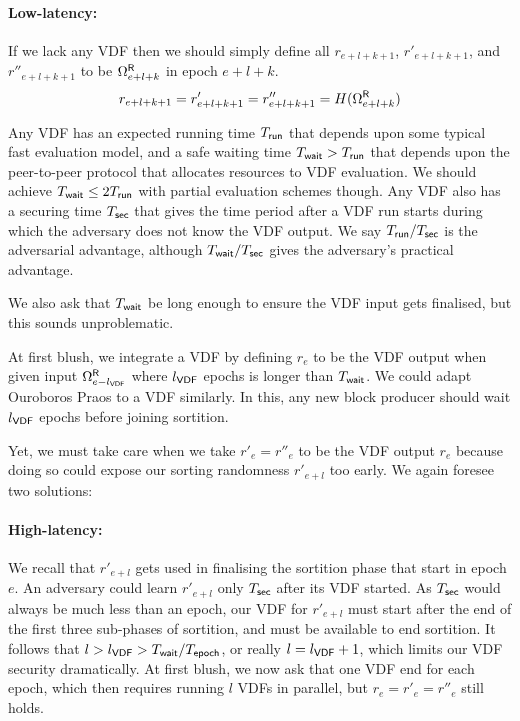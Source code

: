 \paragraph{Low-latency:} 
If we lack any VDF then we should simply define all $r_{e+l+k+1}$, $r'_{e+l+k+1}$, and $r''_{e+l+k+1}$ to be $\Omega^{\mathsf{R}}_{e+l+k}$ in epoch $e+l+k$.
$$
r_{e+l+k+1} = r'_{e+l+k+1} = r''_{e+l+k+1} = H(\Omega^{\mathsf{R}}_{e+l+k})
$$

Any VDF has an expected running time $T_{\mathsf{run}}$ that depends upon some typical fast evaluation model, and a safe waiting time $T_{\mathsf{wait}} > T_{\mathsf{run}}$ that depends upon the peer-to-peer protocol that allocates resources to VDF evaluation.  We should achieve $T_{\mathsf{wait}} \le 2 T_{\mathsf{run}}$ with partial evaluation schemes though.  Any VDF also has a securing time $T_{\mathsf{sec}}$ that gives the time period after a VDF run starts during which the adversary does not know the VDF output.  We say $T_{\mathsf{run}}/T_{\mathsf{sec}}$ is the adversarial advantage, although $T_{\mathsf{wait}}/T_{\mathsf{sec}}$ gives the adversary's practical advantage.  

We also ask that $T_{\mathsf{wait}}$ be long enough to ensure the VDF input gets finalised, but this sounds unproblematic.  

At first blush, we integrate a VDF by defining $r_e$ to be the VDF output when given input $\Omega^{\mathsf{R}}_{e-l_{\mathsf{VDF}}}$ where $l_{\mathsf{VDF}}$ epochs is longer than $T_{\mathsf{wait}}$.  We could adapt Ouroboros Praos \cite{Praos} to a VDF similarly.  In this, any new block producer should wait $l_{\mathsf{VDF}}$ epochs before joining sortition. 

Yet, we must take care when we take $r'_e = r''_e$ to be the VDF output $r_e$ because doing so could expose our sorting randomness $r'_{e+l}$ too early.  We again foresee two solutions:

\paragraph{High-latency:} 
We recall that $r'_{e+l}$ gets used in finalising the sortition phase that start in epoch $e$.  An adversary could learn $r'_{e+l}$ only $T_{\mathsf{sec}}$ after its VDF started.  As $T_{\mathsf{sec}}$ would always be much less than an epoch, our VDF for $r'_{e+l}$ must start after the end of the first three sub-phases of sortition, and must be available to end sortition.  It follows that $l > l_{\mathsf{VDF}} > T_{\mathsf{wait}}/T_{\mathsf{epoch}}$, or really $l = l_{\mathsf{VDF}} + 1$, which limits our VDF security dramatically.  At first blush, we now ask that one VDF end for each epoch, which then requires running $l$ VDFs in parallel, but $r_e = r'_e = r''_e$ still holds.

